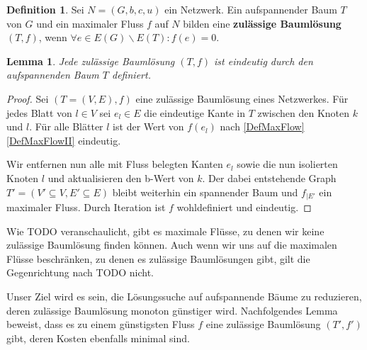 \documentclass[a4paper,twoside,ngerman]{report}
\theoremstyle{plain}
\newtheorem{lem}[thm]{Lemma}
\theoremstyle{definition}
\newtheorem{defn}[thm]{Definition}
\begin{document}
\begin{defn}Sei $N=(G,b,c,u)$ ein Netzwerk. Ein aufspannender Baum $T$ von $G$ und ein maximaler Fluss $f$ auf $N$ bilden eine \textbf{zulässige Baumlösung} $(T,f)$, wenn $\forall e\in E(G)\backslash E(T): f(e) = 0$.\end{defn}

\begin{lem}Jede zulässige Baumlösung $(T,f)$ ist eindeutig durch den aufspannenden Baum $T$ definiert.\end{lem}
\begin{proof}Sei $(T=(V,E),f)$ eine zulässige Baumlösung eines Netzwerkes. Für jedes Blatt von $l\in V$ sei $e_l\in E$ die eindeutige Kante in $T$ zwischen den Knoten $k$ und $l$. Für alle Blätter $l$ ist der Wert von $f(e_l)$ nach \cref{DefMaxFlow} \cref{DefMaxFlowII} eindeutig.
	
Wir entfernen nun alle mit Fluss belegten Kanten $e_l$ sowie die nun isolierten Knoten $l$ und aktualisieren den b-Wert von $k$. Der dabei entstehende Graph $T'=(V'\subseteq V,E'\subseteq E)$ bleibt weiterhin ein spannender Baum und $f_{|E'}$ ein maximaler Fluss. Durch Iteration ist $f$ wohldefiniert und eindeutig.\end{proof}

Wie TODO veranschaulicht, gibt es maximale Flüsse, zu denen wir keine zulässige Baumlösung finden können. Auch wenn wir uns auf die maximalen Flüsse beschränken, zu denen es zulässige Baumlösungen gibt, gilt die Gegenrichtung nach TODO nicht.

\begin{figure}[!h]\centering
{}
\end{figure}

Unser Ziel wird es sein, die Lösungssuche auf aufspannende Bäume zu reduzieren, deren zulässige Baumlösung monoton günstiger wird. Nachfolgendes Lemma beweist, dass es zu einem günstigsten Fluss $f$ eine zulässige Baumlösung $(T',f')$ gibt, deren Kosten ebenfalls minimal sind.
\end{document}
